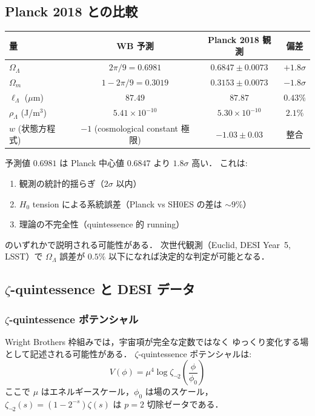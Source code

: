 \documentclass[11pt,a4paper]{article}
\begin{document}
\subsection{Planck 2018 との比較}

\begin{center}
\begin{tabular}{lccc}
\toprule
量 & WB 予測 & Planck 2018 観測 & 偏差 \\
\midrule
$\Omega_\Lambda$ & $2\pi/9 = 0.6981$ & $0.6847 \pm 0.0073$ & $+1.8\sigma$ \\
$\Omega_m$ & $1 - 2\pi/9 = 0.3019$ & $0.3153 \pm 0.0073$ & $-1.8\sigma$ \\
$\ell_\Lambda$ ($\mu$m) & $87.49$ & $87.87$ & $0.43\%$ \\
$\rho_\Lambda$ (J/m$^3$) & $5.41\times10^{-10}$ & $5.30\times10^{-10}$ & $2.1\%$ \\
$w$ (状態方程式) & $-1$ (cosmological constant 極限) & $-1.03 \pm 0.03$ & 整合 \\
\bottomrule
\end{tabular}
\end{center}

\begin{warningbox}[注意: 2\% のずれの解釈]
予測値 $0.6981$ は Planck 中心値 $0.6847$ より $1.8\sigma$ 高い．
これは:
\begin{enumerate}
\item 観測の統計的揺らぎ（$2\sigma$ 以内）
\item $H_0$ tension による系統誤差（Planck vs SH0ES の差は $\sim9\%$）
\item 理論の不完全性（quintessence 的 running）
\end{enumerate}
のいずれかで説明される可能性がある．
次世代観測（Euclid, DESI Year~5, LSST）で $\Omega_\Lambda$ 誤差が
$0.5\%$ 以下になれば決定的な判定が可能となる．
\end{warningbox}

\subsection{$\zeta$-quintessence と DESI データ}

\subsubsection{$\zeta$-quintessence ポテンシャル}

Wright Brothers 枠組みでは，宇宙項が完全な定数ではなく
ゆっくり変化する場として記述される可能性がある．
$\zeta$-quintessence ポテンシャルは:
\begin{equation}
V(\phi) = \mu^4 \log \zeta_{\neg 2}\!\left(\frac{\phi}{\phi_0}\right)
\end{equation}
ここで $\mu$ はエネルギースケール，$\phi_0$ は場のスケール，
$\zeta_{\neg 2}(s) = (1-2^{-s})\zeta(s)$ は $p=2$ 切除ゼータである．
\end{document}
